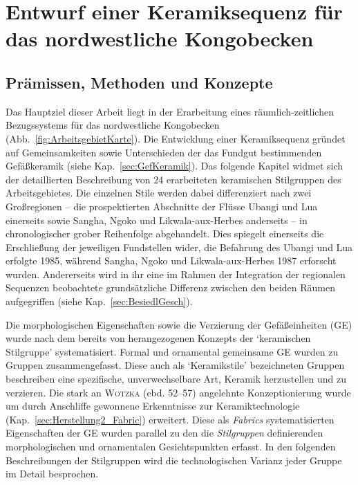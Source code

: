 \chapter{Entwurf einer Keramiksequenz für das nordwestliche Kongobecken}\label{sec:Keramiksequenz}

\section{Prämissen, Methoden und Konzepte}

Das Hauptziel dieser Arbeit liegt in der Erarbeitung eines räumlich-zeitlichen Bezugssystems für das nordwestliche Kongobecken (Abb.~\ref{fig:ArbeitsgebietKarte}). Die Entwicklung einer Keramiksequenz gründet auf Gemeinsamkeiten sowie Unterschieden der das Fundgut bestimmenden Gefäßkeramik (siehe Kap.~\ref{sec:GefKeramik}). Das folgende Kapitel widmet sich der detaillierten Beschreibung von 24 erarbeiteten keramischen Stilgruppen des Arbeitsgebietes. Die einzelnen Stile werden dabei differenziert nach zwei Großregionen -- die prospektierten Abschnitte der Flüsse Ubangi und Lua einerseits sowie Sangha, Ngoko und Likwala-aux-Herbes anderseits -- in chronologischer grober Reihenfolge abgehandelt. Dies spiegelt einerseits die Erschließung der jeweiligen Fundstellen wider, die Befahrung des Ubangi und Lua erfolgte 1985, während Sangha, Ngoko und Likwala-aux-Herbes 1987 erforscht wurden. Andererseits wird in ihr eine im Rahmen der Integration der regionalen Sequenzen beobachtete grundsätzliche Differenz zwischen den beiden Räumen aufgegriffen (siehe Kap.~\ref{sec:BesiedlGesch}).

Die morphologischen Eigenschaften sowie die Verzierung der Gefäßeinheiten (GE) wurde nach dem bereits von \textcite[52--57]{Wotzka.1995} herangezogenen Konzepts der \enquote*{keramischen Stilgruppe} systematisiert. Formal und ornamental gemeinsame GE wurden zu Gruppen zusammengefasst. Diese auch als \enquote*{Keramikstile} bezeichneten Gruppen beschreiben eine spezifische, unverwechselbare Art, Keramik herzustellen und zu verzieren. Die stark an \textsc{Wotzka} (ebd. 52--57) angelehnte Konzeptionierung wurde um durch Anschliffe gewonnene Erkenntnisse zur Keramiktechnologie (Kap.~\ref{sec:Herstellung2_Fabric}) erweitert. Diese als \textit{Fabrics} systematisierten Eigenschaften der GE wurden parallel zu den die \textit{Stilgruppen} definierenden morphologischen und ornamentalen Gesichtspunkten erfasst. In den folgenden Beschreibungen der Stilgruppen wird die technologischen Varianz jeder Gruppe im Detail besprochen.

